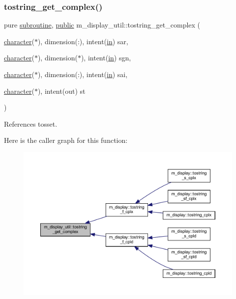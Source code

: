 \subsubsection{\texorpdfstring{tostring\+\_\+get\+\_\+complex()}{tostring\_get\_complex()}}
{\footnotesize\ttfamily pure \hyperlink{M__stopwatch_83_8txt_acfbcff50169d691ff02d4a123ed70482}{subroutine}, \hyperlink{M__stopwatch_83_8txt_a2f74811300c361e53b430611a7d1769f}{public} m\+\_\+display\+\_\+util\+::tostring\+\_\+get\+\_\+complex (\begin{DoxyParamCaption}\item[{\hyperlink{option__stopwatch_83_8txt_abd4b21fbbd175834027b5224bfe97e66}{character}($\ast$), dimension(\+:), intent(\hyperlink{M__journal_83_8txt_afce72651d1eed785a2132bee863b2f38}{in})}]{sar,  }\item[{\hyperlink{option__stopwatch_83_8txt_abd4b21fbbd175834027b5224bfe97e66}{character}($\ast$), dimension($\ast$), intent(\hyperlink{M__journal_83_8txt_afce72651d1eed785a2132bee863b2f38}{in})}]{sgn,  }\item[{\hyperlink{option__stopwatch_83_8txt_abd4b21fbbd175834027b5224bfe97e66}{character}($\ast$), dimension(\+:), intent(\hyperlink{M__journal_83_8txt_afce72651d1eed785a2132bee863b2f38}{in})}]{sai,  }\item[{\hyperlink{option__stopwatch_83_8txt_abd4b21fbbd175834027b5224bfe97e66}{character}($\ast$), intent(out)}]{st }\end{DoxyParamCaption})}



References tosset.

Here is the caller graph for this function\+:
\nopagebreak
\begin{figure}[H]
\begin{center}
\leavevmode
\includegraphics[width=350pt]{namespacem__display__util_a7803f63457d826fc3b8fe7ddfa7818ac_icgraph}
\end{center}
\end{figure}
\mbox{\label{namespacem__display__util_ac428024047b90a34278426d21759faa0}} 
